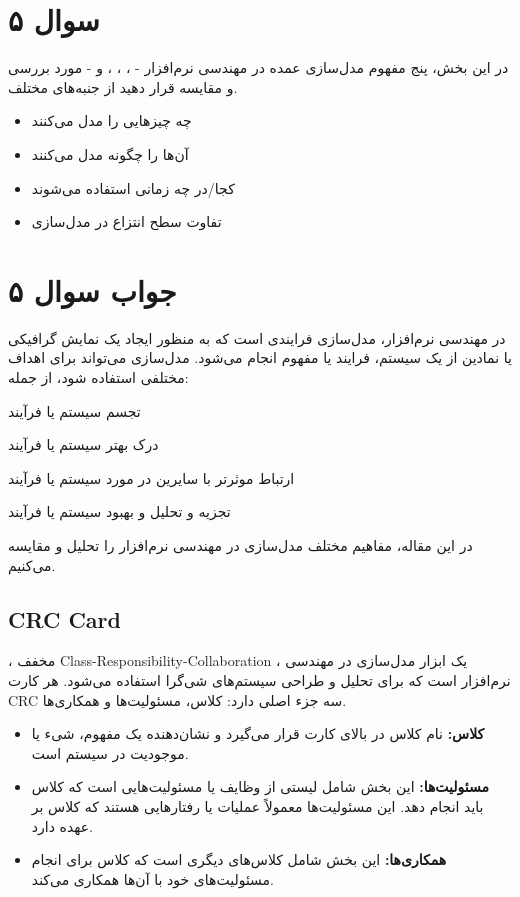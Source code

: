 \section*{سوال ۵}

در این بخش، پنج مفهوم مدل‌سازی عمده در مهندسی نرم‌افزار -
،
،
،
و
- مورد بررسی و مقایسه قرار دهید از جنبه‌های مختلف.

\begin{itemize}
	\item چه چیزهایی را مدل می‌کنند
	\item آن‌ها را چگونه مدل می‌کنند
	\item کجا/در چه زمانی استفاده می‌شوند
	\item تفاوت سطح انتزاع در مدل‌سازی
\end{itemize}

\section*{جواب سوال ۵}

در مهندسی نرم‌افزار، مدل‌سازی فرایندی است که به منظور ایجاد یک نمایش گرافیکی یا نمادین از یک سیستم، فرایند یا مفهوم انجام می‌شود. مدل‌سازی می‌تواند برای اهداف مختلفی استفاده شود، از جمله:

تجسم سیستم یا فرآیند

درک بهتر سیستم یا فرآیند

ارتباط موثرتر با سایرین در مورد سیستم یا فرآیند

تجزیه و تحلیل و بهبود سیستم یا فرآیند

در این مقاله، مفاهیم مختلف مدل‌سازی در مهندسی نرم‌افزار را تحلیل و مقایسه می‌کنیم.

\subsection*{CRC Card}

 ، مخفف Class-Responsibility-Collaboration ، یک ابزار مدل‌سازی در مهندسی نرم‌افزار است که برای تحلیل و طراحی سیستم‌های شی‌گرا استفاده می‌شود. هر کارت CRC سه جزء اصلی دارد: کلاس، مسئولیت‌ها و همکاری‌ها.

\begin{itemize}
	\item \textbf{کلاس:} نام کلاس در بالای کارت قرار می‌گیرد و نشان‌دهنده یک مفهوم، شیء یا موجودیت در سیستم است.
	\item \textbf{مسئولیت‌ها:} این بخش شامل لیستی از وظایف یا مسئولیت‌هایی است که کلاس باید انجام دهد. این مسئولیت‌ها معمولاً عملیات یا رفتارهایی هستند که کلاس بر عهده دارد.
	\item \textbf{همکاری‌ها:} این بخش شامل کلاس‌های دیگری است که کلاس برای انجام مسئولیت‌های خود با آن‌ها همکاری می‌کند.
\end{itemize}


